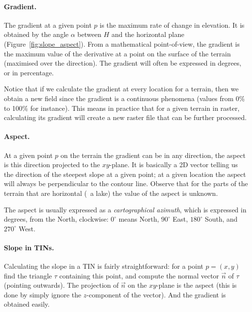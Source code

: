 \paragraph{Gradient.} 
The gradient at a given point $p$ is the maximum rate of change in elevation. 
It is obtained by the angle $\alpha$ between $H$ and the horizontal plane (Figure~\ref{fig:slope_aspect}).
From a mathematical point-of-view, the gradient is the maximum value of the derivative at a point on the surface of the terrain (maximised over the direction).
The gradient will often be expressed in degrees, or in percentage.

Notice that if we calculate the gradient at every location for a terrain, then we obtain a new field since the gradient is a continuous phenomena (values from 0\% to 100\% for instance).
This means in practice that for a given terrain in raster, calculating its gradient will create a new raster file that can be further processed.


\paragraph{Aspect.}
At a given point $p$ on the terrain the gradient can be in any direction, the aspect is this direction projected to the $xy$-plane. 
It is basically a 2D vector telling us the direction of the steepest slope at a given point; at a given location the aspect will always be perpendicular to the contour line.
Observe that for the parts of the terrain that are horizontal (\eg\ a lake) the value of the aspect is unknown.

The aspect is usually expressed as a \emph{cartographical azimuth},
which is expressed in degrees, from the North, clockwise: $0^{\circ}$ means North, $90^{\circ}$ East, $180^{\circ}$ South, and $270^{\circ}$ West.



\paragraph{Slope in TINs.}

Calculating the slope in a TIN is fairly straightforward: for a point $p=(x,y)$ find the triangle $\tau$ containing this point, and compute the normal vector $\vec{n}$ of $\tau$ (pointing outwards). 
The projection of $\vec{n}$ on the $xy$-plane is the aspect (this is done by simply ignore the $z$-component of the vector).
And the gradient is obtained easily.


